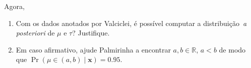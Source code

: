 \documentclass[a4paper,10pt, notitlepage]{report}
\begin{document}
\begin{enumerate}
Agora, 
\begin{enumerate}
 \item Com os dados anotados por Valciclei, é possível computar a distribuição~\textit{a posteriori} de $\mu$ e $\tau$? Justifique.
 \item Em caso afirmativo, ajude Palmirinha a encontrar $a, b \in \mathbb{R}$, $a < b$ de modo que $\operatorname{Pr}(\mu \in (a, b) \mid \boldsymbol{x}) = 0.95$.
\end{enumerate}

    
\end{enumerate}





\end{document}

